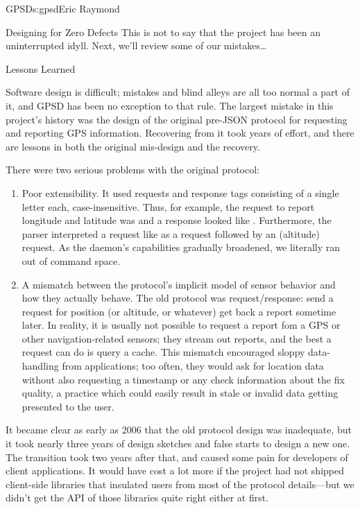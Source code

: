 \begin{aosachapter}{GPSD}{s:gpsd}{Eric Raymond}
\begin{aosasect1}{Designing for Zero Defects}
This is not to say that the project has been an uninterrupted idyll.  
Next, we'll review some of our mistakes{\ldots}

\end{aosasect1}

\begin{aosasect1}{Lessons Learned}

Software design is difficult; mistakes and blind alleys are all too
normal a part of it, and GPSD has been no exception to that rule.  The
largest mistake in this project's history was the design of the
original pre-JSON protocol for requesting and reporting GPS
information.  Recovering from it took years of effort, and there are
lessons in both the original mis-design and the recovery.

There were two serious problems with the original protocol:

\begin{enumerate}

  \item Poor extensibility.  It used requests and response tags
    consisting of a single letter each, case-insensitive. Thus, for
    example, the request to report longitude and latitude was
     and a response looked like . 
    Furthermore, the parser interpreted a request like
     as a  request followed by an 
    (altitude) request.  As the daemon's capabilities gradually
    broadened, we literally ran out of command space.

  \item A mismatch between the protocol's implicit model of sensor
    behavior and how they actually behave.  The old protocol was
    request/response: send a request for position (or altitude, or
    whatever) get back a report sometime later. In reality, it is
    usually not possible to request a report fom a GPS or other
    navigation-related sensors; they stream out reports, and the best
    a request can do is query a cache.  This mismatch encouraged
    sloppy data-handling from applications; too often, they would ask
    for location data without also requesting a timestamp or any check
    information about the fix quality, a practice which could easily
    result in stale or invalid data getting presented to the user.

\end{enumerate}

It became clear as early as 2006 that the old protocol design was
inadequate, but it took nearly three years of design sketches and 
false starts to design a new one.  The transition took two years
after that, and caused some pain for developers of client applications.
It would have cost a lot more if the project had not shipped client-side
libraries that insulated users from most of the protocol details---but
we didn't get the API of those libraries quite right either at first.


\end{aosasect1}
\end{aosachapter}
